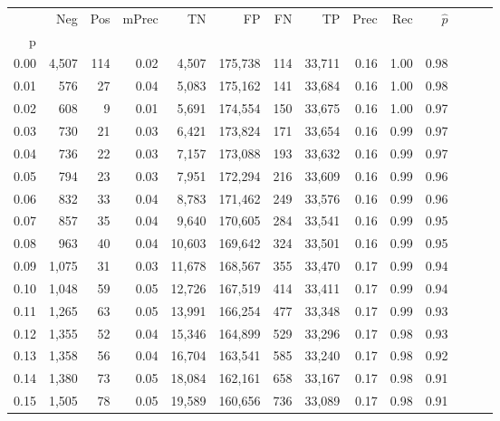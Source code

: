 \begin{tabular}{rrrrrrrrrrrrrr}
\toprule
{} &    Neg &    Pos & mPrec &       TN &       FP &      FN &      TP &  Prec &   Rec & $\hat{p}$ \\
p    &        &        &       &          &          &         &         &       &       &           \\
\midrule
0.00 &  4,507 &    114 &  0.02 &    4,507 &  175,738 &     114 &  33,711 &  0.16 &  1.00 &      0.98 \\
0.01 &    576 &     27 &  0.04 &    5,083 &  175,162 &     141 &  33,684 &  0.16 &  1.00 &      0.98 \\
0.02 &    608 &      9 &  0.01 &    5,691 &  174,554 &     150 &  33,675 &  0.16 &  1.00 &      0.97 \\
0.03 &    730 &     21 &  0.03 &    6,421 &  173,824 &     171 &  33,654 &  0.16 &  0.99 &      0.97 \\
0.04 &    736 &     22 &  0.03 &    7,157 &  173,088 &     193 &  33,632 &  0.16 &  0.99 &      0.97 \\
0.05 &    794 &     23 &  0.03 &    7,951 &  172,294 &     216 &  33,609 &  0.16 &  0.99 &      0.96 \\
0.06 &    832 &     33 &  0.04 &    8,783 &  171,462 &     249 &  33,576 &  0.16 &  0.99 &      0.96 \\
0.07 &    857 &     35 &  0.04 &    9,640 &  170,605 &     284 &  33,541 &  0.16 &  0.99 &      0.95 \\
0.08 &    963 &     40 &  0.04 &   10,603 &  169,642 &     324 &  33,501 &  0.16 &  0.99 &      0.95 \\
0.09 &  1,075 &     31 &  0.03 &   11,678 &  168,567 &     355 &  33,470 &  0.17 &  0.99 &      0.94 \\
0.10 &  1,048 &     59 &  0.05 &   12,726 &  167,519 &     414 &  33,411 &  0.17 &  0.99 &      0.94 \\
0.11 &  1,265 &     63 &  0.05 &   13,991 &  166,254 &     477 &  33,348 &  0.17 &  0.99 &      0.93 \\
0.12 &  1,355 &     52 &  0.04 &   15,346 &  164,899 &     529 &  33,296 &  0.17 &  0.98 &      0.93 \\
0.13 &  1,358 &     56 &  0.04 &   16,704 &  163,541 &     585 &  33,240 &  0.17 &  0.98 &      0.92 \\
0.14 &  1,380 &     73 &  0.05 &   18,084 &  162,161 &     658 &  33,167 &  0.17 &  0.98 &      0.91 \\
0.15 &  1,505 &     78 &  0.05 &   19,589 &  160,656 &     736 &  33,089 &  0.17 &  0.98 &      0.91 \\

\end{tabular}
